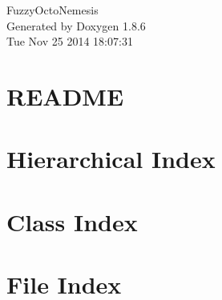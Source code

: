 \documentclass[twoside]{book}
\newcommand{\clearemptydoublepage}{%
  \newpage{\pagestyle{empty}\cleardoublepage}%
}
\begin{document}
\begin{titlepage}
\vspace*{7cm}
\begin{center}%
{\Large Fuzzy\-Octo\-Nemesis }\\
\vspace*{1cm}
{\large Generated by Doxygen 1.8.6}\\
\vspace*{0.5cm}
{\small Tue Nov 25 2014 18:07:31}\\
\end{center}
\end{titlepage}
\clearemptydoublepage
\tableofcontents
\clearemptydoublepage
{}

\chapter{R\-E\-A\-D\-M\-E}
\label{md__r_e_a_d_m_e}

\chapter{Hierarchical Index}

\chapter{Class Index}

\chapter{File Index}

\end{document}
